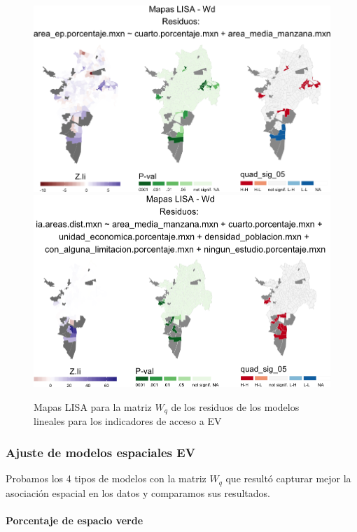 \documentclass[12pt,]{book}
\let\oldparagraph\paragraph
\renewcommand{\paragraph}[1]{\oldparagraph{#1}\mbox{}}
\begin{document}
\begin{figure}
\includegraphics[width=1\linewidth]{tesis-unigis_files/figure-latex/mapas-lisa-resev-wq-1} \includegraphics[width=1\linewidth]{tesis-unigis_files/figure-latex/mapas-lisa-resev-wq-2} \caption{Mapas LISA para la matriz $W_q$ de los residuos de los modelos lineales para los indicadores de acceso a EV}\label{fig:mapas-lisa-resev-wq}
\end{figure}

\subsubsection{Ajuste de modelos espaciales
EV}\label{ajuste-de-modelos-espaciales-ev}

Probamos los 4 tipos de modelos con la matriz \(W_q\) que resultó
capturar mejor la asociación espacial en los datos y comparamos sus
resultados.

\paragraph{Porcentaje de espacio
verde}\label{porcentaje-de-espacio-verde}
\end{document}
